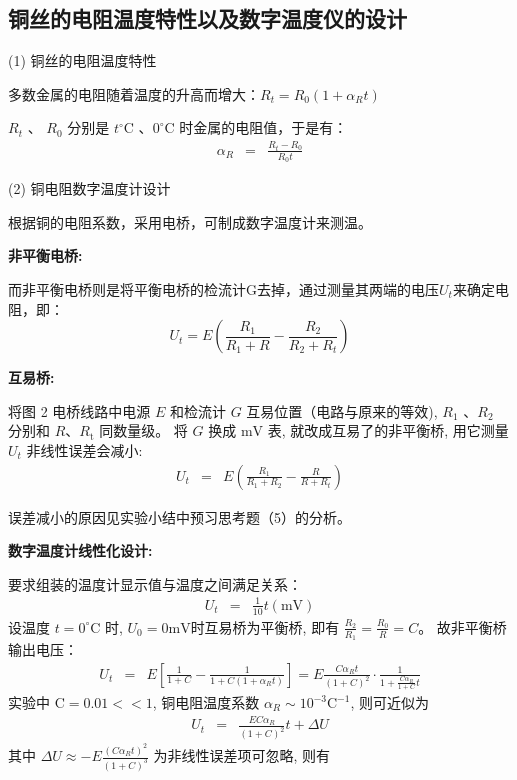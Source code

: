 \documentclass[UTF8]{ctexart}
\begin{document}
    \subsection{铜丝的电阻温度特性以及数字温度仪的设计}
    \noindent (1) 铜丝的电阻温度特性

    多数金属的电阻随着温度的升高而增大：$R_{t} = R_{0}\left(1+\alpha_{R} t\right)$

    $R_{t}$ 、 $R_{0}$  分别是 $ t^{\circ} \mathrm{C}$ 、$ 0^{\circ} \mathrm{C}$  时金属的电阻值，于是有：
    \begin{eqnarray}
        \alpha_{R} & = & \frac{R_{t}-R_{0}}{R_{0} t}
    \end{eqnarray}

    \noindent (2) 铜电阻数字温度计设计

    根据铜的电阻系数，采用电桥，可制成数字温度计来测温。

    \noindent \textbf{非平衡电桥:}
 
    而非平衡电桥则是将平衡电桥的检流计G去掉，通过测量其两端的电压$U_t$来确定电阻，即：
    $$U_{t}=E\left(\frac{R_{1}}{R_{1}+R}-\frac{R_{2}}{R_{2}+R_{t}}\right)$$

    \noindent \textbf{互易桥:}

    将图 2 电桥线路中电源 $ E $ 和检流计 $ G $ 互易位置（电路与原来的等效), 
    $ R_{1}$ 、$ R_{2}$  分别和  $R $、$ R_{\mathrm{t}} $ 同数量级。
    将 $ G$ 换成 $ \mathrm{mV}$  表, 就改成互易了的非平衡桥, 用它测量  $U_{t}$  非线性误差会减小:
    \begin{eqnarray}
        U_{t} & = & E\left(\frac{R_{1}}{R_{1}+R_{2}}-\frac{R}{R+R_{t}}\right)
    \end{eqnarray}

    误差减小的原因见实验小结中预习思考题（5）的分析。


    \noindent \textbf{数字温度计线性化设计:}

    要求组装的温度计显示值与温度之间满足关系：
    \begin{eqnarray}
        U_{t} & = & \frac{1}{10} t(\mathrm{mV})
    \end{eqnarray}
    设温度  $t=0^{\circ} \mathrm{C} $ 时, $ U_{0}=0 \mathrm{mV} $时互易桥为平衡桥, 即有
    $ \frac{R_{2}}{R_{1}}= \frac{R_{0}}{R}=C $。
    故非平衡桥输出电压：
    \begin{eqnarray}
        U_{t} & = & E\left[\frac{1}{1+C}-\frac{1}{1+C\left(1+\alpha_{R} t\right)}\right] 
         =  E \frac{C \alpha_{R} t}{(1+C)^{2}} \cdot \frac{1}{1+\frac{C \alpha_{R}}{1+C} t}
    \end{eqnarray}
    实验中 $ \mathrm{C}=0.01<<1 $, 铜电阻温度系数  $\alpha_{R} \sim 10^{-3} \mathrm{C}^{-1} $, 则可近似为
    \begin{eqnarray}
        U_{t} & = & \frac{E C \alpha_{R}}{(1+C)^{2}} t+\Delta U
    \end{eqnarray}
    其中 $ \Delta U \approx-E \frac{\left(C \alpha_{R} t\right)^{2}}{(1+C)^{3}} $ 为非线性误差项可忽略, 则有
    
\end{document}
